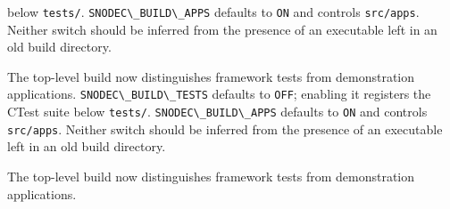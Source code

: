 \documentclass[
  a4paper,
  openany]{book}
\providecommand{\passthrough}[1]{#1}
\begin{document}
below \passthrough{\lstinline!tests/!}.
\passthrough{\lstinline!SNODEC\_BUILD\_APPS!} defaults to
\passthrough{\lstinline!ON!} and controls
\passthrough{\lstinline!src/apps!}. Neither switch should be inferred
from the presence of an executable left in an old build directory.\par
\clearpage
{}
\begingroup\raggedright The top-level build now distinguishes framework tests from demonstration
applications. \passthrough{\lstinline!SNODEC\_BUILD\_TESTS!} defaults to
\passthrough{\lstinline!OFF!}; enabling it registers the CTest suite
below \passthrough{\lstinline!tests/!}.
\passthrough{\lstinline!SNODEC\_BUILD\_APPS!} defaults to
\passthrough{\lstinline!ON!} and controls
\passthrough{\lstinline!src/apps!}. Neither switch should be inferred
from the presence of an executable left in an old build directory.\par\endgroup
\clearpage
{}
The top-level build now distinguishes framework tests from demonstration
applications.
\end{document}

